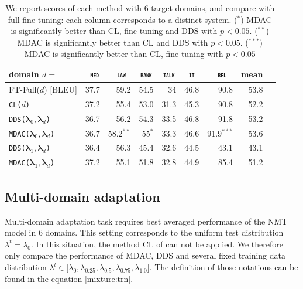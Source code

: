 \documentclass[11pt]{article}
\newcommand{\domain}[1]{\texttt{\textsc{#1}}}
\newcommand{\system}[1]{\texttt{{#1}}}
\newcommand{\vlambda}{\ensuremath{\boldsymbol\lambda}\xspace} %
\begin{document}
\begin{table}[htbp]
  \centering \small
  \begin{tabular}{|l|*8{r|}} \hline
    domain \hfill $d=$ & \multicolumn{1}{c|}{\domain{ med}} & \multicolumn{1}{c|}{\domain{ law}} & \multicolumn{1}{c|}{\domain{bank}} & \multicolumn{1}{c|}{\domain{talk}} & \multicolumn{1}{c|}{\domain{ it }} & \multicolumn{1}{c|}{\domain{ rel}} & \multicolumn{1}{c|}{mean} \\ \hline
    FT-Full($d$) \hfill [BLEU] &37.7&59.2&54.5&34&46.8&90.8&53.8\\ \hline
    \hline
    \system{CL($d$)} &37.2&55.4&53.0&31.3&45.3&90.8&52.2\\ \hline
    \system{DDS($\vlambda_0, \vlambda_d$)} &36.7&56.2&54.3&33.5&46.8&91.8&53.2\\
    \system{MDAC($\vlambda_0, \vlambda_d$)} &36.7&58.2$^{**}$&55$^{*}$&33.3&46.6&91.9$^{***}$&53.6\\
     \hline
    \system{DDS($\vlambda_1, \vlambda_d$)} &36.4&56.3& 45.4& 32.6&44.5&43.1&43.1\\
    \system{MDAC($\vlambda_1, \vlambda_d$)} &37.2&55.1&51.8&32.8&44.9&85.4&51.2 \\ \hline
  \end{tabular}
  \caption{We report scores of each method with 6 target domains, and compare with full fine-tuning: each column corresponds to a distinct system. ($^{*}$) MDAC is significantly better than CL, fine-tuning and DDS with $p<0.05$. ($^{**}$) MDAC is significantly better than CL and DDS with $p<0.05$. ($^{***}$) MDAC is significantly better than CL, fine-tuning with $p<0.05$}
  \label{tab:da}
\end{table}

\subsection{Multi-domain adaptation}

Multi-domain adaptation task requires best averaged performance of the NMT model in 6 domains. This setting corresponds to the uniform test distribution $\lambda^t = \lambda_0$. In this situation, the method CL of \citet{Zhang19curriculum} can not be applied. We therefore only compare the performance of MDAC, DDS and several fixed training data distribution $\lambda^l \in \big[ \lambda_0, \lambda_{0.25}, \lambda_{0.5}, \lambda_{0.75}, \lambda_{1.0}\big]$. The definition of those notations can be found in the equation \ref{mixture:trn}.
\end{document}
